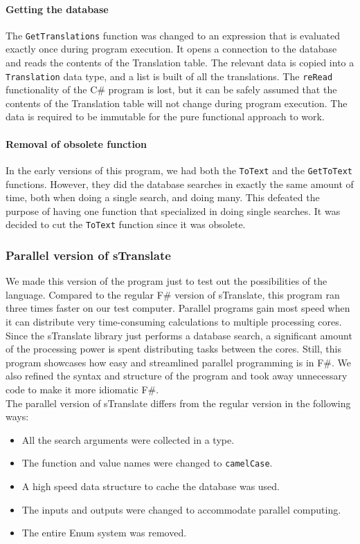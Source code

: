 \documentclass[12pt, a4paper]{article}
\newcommand{\code}[1]{{\small \texttt{#1}}}
\begin{document}
\paragraph{Getting the database} The \code{GetTranslations} function was changed to an expression that is evaluated exactly once during program execution. It opens a connection to the database and reads the contents of the Translation table. The relevant data is copied into a \code{Translation} data type, and a list is built of all the translations. The \code{reRead} functionality of the C\# program is lost, but it can be safely assumed that the contents of the Translation table will not change during program execution. The data is required to be immutable for the pure functional approach to work.

\paragraph{Removal of obsolete function} In the early versions of this program, we had both the \code{ToText} and the \code{GetToText} functions. However, they did the database searches in exactly the same amount of time, both when doing a single search, and doing many. This defeated the purpose of having one function that specialized in doing single searches. It was decided to cut the \code{ToText} function since it was obsolete.

\newpage


\subsubsection{Parallel version of sTranslate}
We made this version of the program just to test out the possibilities of the language. Compared to the regular F\# version of sTranslate, this program ran three times faster on our test computer. Parallel programs gain most speed when it can distribute very time-consuming calculations to multiple processing cores. Since the sTranslate library just performs a database search, a significant amount of the processing power is spent distributing tasks between the cores. Still, this program showcases how easy and streamlined parallel programming is in F\#. We also refined the syntax and structure of the program and took away unnecessary code to make it more idiomatic F\#.\\

The parallel version of sTranslate differs from the regular version in the following ways:
\begin{itemize}
	\item All the search arguments were collected in a type.
	\item The function and value names were changed to \code{camelCase}.
	\item A high speed data structure to cache the database was used.
	\item The inputs and outputs were changed to accommodate parallel computing.
	\item The entire Enum system was removed.
\end{itemize}
\end{document}
